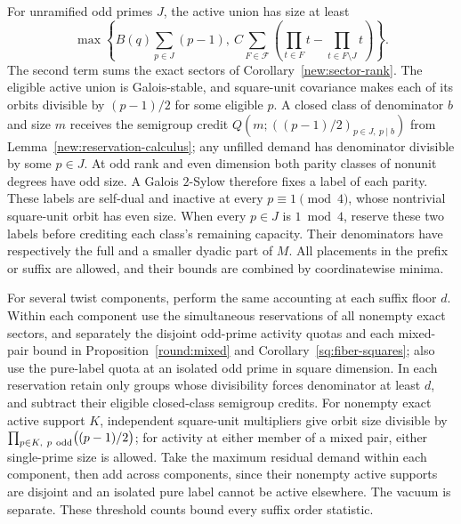 \documentclass[11pt]{amsart}
\numberwithin{equation}{section}
\theoremstyle{definition}
\theoremstyle{plain}
\begin{document}
For unramified odd primes $J$, the active union has size at least
\[
 \max\left\{
 B(q)\sum_{p\in J}(p-1),\
 C\sum_{F\in\mathcal F}
   \left(\prod_{t\in F}t-\prod_{t\in F\setminus J}t\right)
 \right\}.
\]
The second term sums the exact sectors of
Corollary~\ref{new:sector-rank}. The eligible active union is
Galois-stable, and square-unit covariance makes each of its orbits
divisible by $(p-1)/2$ for some eligible $p$.
A closed class of denominator $b$
and size $m$ receives the semigroup credit
$Q(m;((p-1)/2)_{p\in J,\ p\mid b})$ from
Lemma~\ref{new:reservation-calculus}; any unfilled demand has
denominator divisible by some $p\in J$.
At odd rank and even dimension both parity classes of nonunit
degrees have odd size. A Galois $2$-Sylow therefore fixes a label
of each parity. These labels are self-dual and inactive at every
$p\equiv1\pmod4$, whose nontrivial square-unit orbit has even size.
When every $p\in J$ is $1\bmod4$, reserve these two labels before
crediting each class's remaining capacity. Their denominators
have respectively the full and a smaller dyadic part of $M$.
All placements in the prefix or suffix are allowed, and their
bounds are combined by coordinatewise minima.

For several twist components, perform the same accounting at each
suffix floor $d$. Within each component use the simultaneous
reservations of all nonempty exact sectors, and separately the
disjoint odd-prime activity quotas and each mixed-pair bound in
Proposition~\ref{round:mixed} and
Corollary~\ref{sq:fiber-squares}; also use the pure-label quota at
an isolated odd prime in square dimension. In each reservation
retain only groups whose divisibility forces denominator at least
$d$, and subtract their eligible closed-class semigroup credits.
For nonempty exact active support $K$, independent square-unit
multipliers give orbit size divisible by
$\prod_{p\in K,\ p\ {\rm odd}}\bigl((p-1)/2\bigr)$; for activity
at either member of a mixed pair, either single-prime size is allowed.
Take the maximum residual demand within each component, then add
across components, since their nonempty active
supports are disjoint and an isolated pure label cannot be active
elsewhere. The vacuum is separate. These threshold counts bound
every suffix order statistic.
\end{document}
